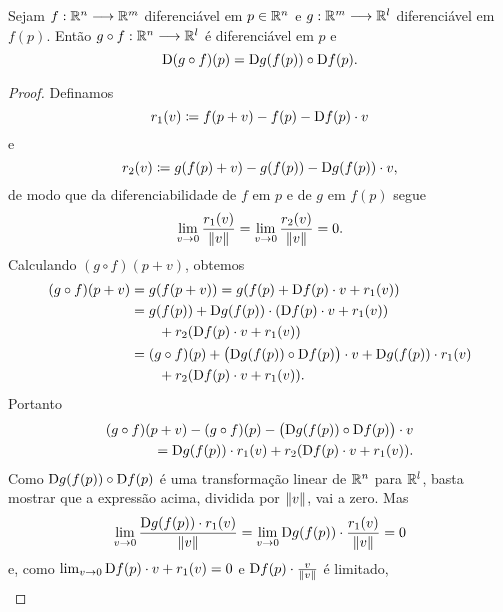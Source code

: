 \begin{prop}
Sejam $f: \mathbb{R}^n \longrightarrow \mathbb{R}^m$ diferenciável em $p \in \mathbb{R}^n$ e $g: \mathbb{R}^m \longrightarrow \mathbb{R}^l$ diferenciável em $f(p)$. Então $g \circ f: \mathbb{R}^n \longrightarrow \mathbb{R}^l$ é diferenciável em $p$ e
	\begin{equation*}
	\mathrm{D} (g \circ f)(p) = \mathrm{D} g(f(p)) \circ \mathrm{D} f(p).
	\end{equation*}
\end{prop}
\begin{proof} Definamos
	\begin{equation*}
	r_1(v) \coloneqq f(p+v) - f(p) - \mathrm{D} f(p) \cdot v
	\end{equation*}
e
	\begin{equation*}
	r_2(v) \coloneqq g(f(p)+v) - g(f(p)) - \mathrm{D} g(f(p)) \cdot v,
	\end{equation*}
de modo que da diferenciabilidade de $f$ em $p$ e de $g$ em $f(p)$ segue
	\begin{equation*}
	\lim_{v \rightarrow 0} \frac{r_1(v)}{\left\Vert{v}\right\Vert} = \lim_{v \rightarrow 0} \frac{r_2(v)}{\left\Vert{v}\right\Vert} = 0.
	\end{equation*}	
Calculando $(g \circ f)(p+v)$, obtemos
	\begin{align*}
	(g \circ f)(p+v) &= g(f(p+v)) = g(f(p)+\mathrm{D} f(p) \cdot v + r_1(v)) \\
		&= g(f(p)) + \mathrm{D} g(f(p)) \cdot (\mathrm{D} f(p) \cdot v + r_1(v)) \\
		&\qquad + r_2(\mathrm{D} f(p) \cdot v + r_1(v)) \\
		&= (g \circ f)(p) + \big(\mathrm{D} g(f(p)) \circ \mathrm{D} f(p)\big) \cdot v + \mathrm{D} g(f(p)) \cdot r_1(v) \\
		&\qquad + r_2(\mathrm{D} f(p) \cdot v + r_1(v)).
	\end{align*}
Portanto
	\begin{align*}
	(g \circ f)(p+v) - (g \circ f)(p) - \big(\mathrm{D} g(f(p)) \circ \mathrm{D} f(p)\big) \cdot v \\
	\qquad = \mathrm{D} g(f(p)) \cdot r_1(v) + r_2(\mathrm{D} f(p) \cdot v + r_1(v)).
	\end{align*}
Como $\mathrm{D} g(f(p)) \circ \mathrm{D} f(p)$ é uma transformação linear de $\mathbb{R}^n$ para $\mathbb{R}^l$, basta mostrar que a expressão acima, dividida por $\left\Vert{v}\right\Vert$, vai a zero. Mas
	\begin{equation*}
	\lim_{v \rightarrow 0} \frac{\mathrm{D} g(f(p)) \cdot r_1(v)}{\left\Vert{v}\right\Vert} = \lim_{v \rightarrow 0} \mathrm{D} g(f(p)) \cdot \frac{r_1(v)}{\left\Vert{v}\right\Vert} = 0
	\end{equation*}
e, como $\lim_{v \rightarrow 0} \mathrm{D} f(p) \cdot v + r_1(v) = 0$ e $\mathrm{D} f(p) \cdot \frac{v}{\left\Vert{v}\right\Vert}$ é limitado,
	\begin{align*}

\end{align*}
\end{proof}
